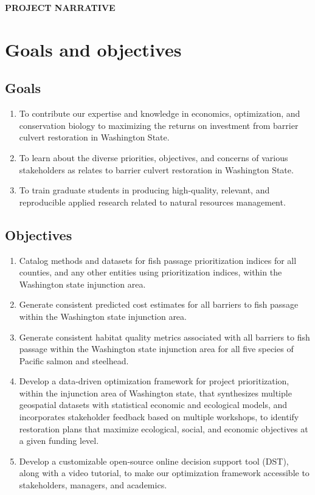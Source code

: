 \documentclass[12pt]{elsarticle}
\begin{document}
\begin{center} \textbf{PROJECT NARRATIVE} \end{center}

%
\section{Goals and objectives} 
\subsection*{Goals}
\begin{enumerate}
\item To contribute our expertise and knowledge in economics, optimization, and conservation biology to maximizing the returns on investment from barrier culvert restoration in Washington State.
\item To learn about the diverse priorities, objectives, and concerns of various stakeholders as relates to barrier culvert restoration in Washington State.
\item To train graduate students in producing high-quality, relevant, and reproducible applied research related to natural resources management.
\end{enumerate}

\subsection*{Objectives}
\begin{enumerate}
\item Catalog methods and datasets for fish passage prioritization indices for all counties, and any other entities using prioritization indices, within the Washington state injunction area. 
\item Generate consistent predicted cost estimates for all barriers to fish passage within the Washington state injunction area. 
\item Generate consistent habitat quality metrics associated with all barriers to fish passage within the Washington state injunction area for all five species of Pacific salmon and steelhead. 
\item Develop a data-driven optimization framework for project prioritization, within the injunction area of Washington state, that synthesizes multiple geospatial datasets with statistical economic and ecological models, and incorporates stakeholder feedback based on multiple workshops, to identify restoration plans that maximize ecological, social, and economic objectives at a given funding level.
\item Develop a customizable open-source online decision support tool (DST), along with a video tutorial, to make our optimization framework accessible to stakeholders, managers, and academics. 
\end{enumerate}
\end{document}

